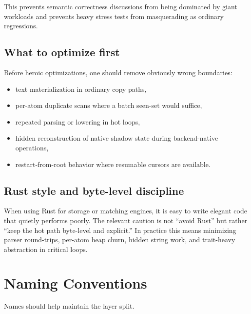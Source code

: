 \documentclass[11pt]{article}
\begin{document}
This prevents semantic correctness discussions from being dominated by giant workloads and prevents heavy stress tests from masquerading as ordinary regressions.

\subsection{What to optimize first}

Before heroic optimizations, one should remove obviously wrong boundaries:

\begin{itemize}
  \item text materialization in ordinary copy paths,
  \item per-atom duplicate scans where a batch seen-set would suffice,
  \item repeated parsing or lowering in hot loops,
  \item hidden reconstruction of native shadow state during backend-native operations,
  \item restart-from-root behavior where resumable cursors are available.
\end{itemize}

\subsection{Rust style and byte-level discipline}

When using Rust for storage or matching engines, it is easy to write elegant code that quietly performs poorly. The relevant caution is not ``avoid Rust'' but rather ``keep the hot path byte-level and explicit.'' In practice this means minimizing parser round-trips, per-atom heap churn, hidden string work, and trait-heavy abstraction in critical loops.

\section{Naming Conventions}

Names should help maintain the layer split.
\end{document}
